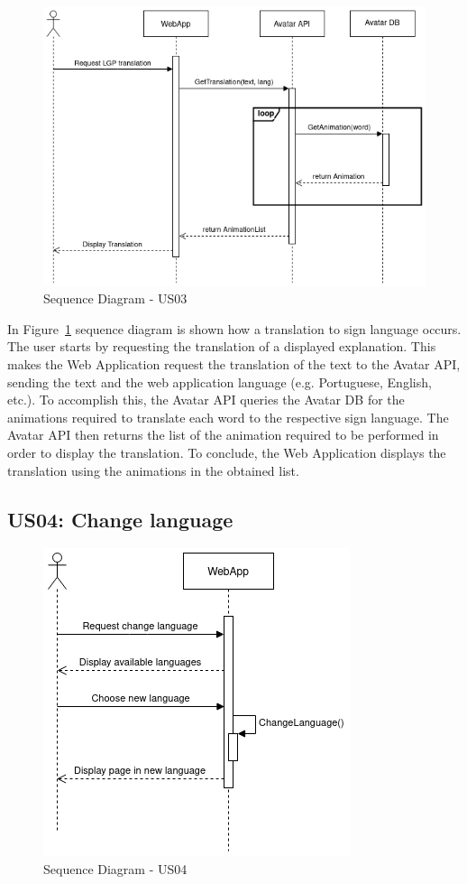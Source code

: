 \begin{figure}[H]
\centering
\includegraphics[scale=0.45]{ch4/assets/US03_SD.png}
\caption[Sequence Diagram US03]{Sequence Diagram - US03}
\label{fig:sdus03}
\end{figure}

In Figure~\ref{fig:sdus03} sequence diagram is shown how a translation to sign language occurs.
The user starts by requesting the translation of a displayed explanation.
This makes the Web Application request the translation of the text to the Avatar API, sending the text and the web application language (e.g. Portuguese, English, etc.).
To accomplish this, the Avatar API queries the Avatar DB for the animations required to translate each word to the respective sign language.
The Avatar API then returns the list of the animation required to be performed in order to display the translation.
To conclude, the Web Application displays the translation using the animations in the obtained list.

\subsection{US04: Change language}

\begin{figure}[H]
\centering
\includegraphics[scale=0.45]{ch4/assets/US04_SD.png}
\caption[Sequence Diagram US04]{Sequence Diagram - US04}
\label{fig:sdus04}
\end{figure}

